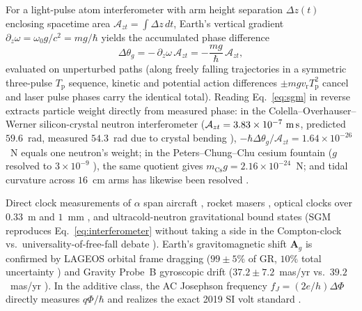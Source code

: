\documentclass[aps,prd,onecolumn,tightenlines,nofootinbib,notitlepage,10pt,floatfix]{revtex4-2}
\theoremstyle{indentedtheorem}
\begin{document}
For a light-pulse atom interferometer with arm height separation $\Delta z(t)$ enclosing spacetime area $\mathcal{A}_{zt}=\int\Delta z\,dt$, Earth's vertical gradient $\partial_z\omega=\omega_0 g/c^2=mg/\hbar$ yields the accumulated phase difference \citep{Anandan1977Gravitational,Stodolsky1979Matter,Kasevich1992Measurement,Storey1994Feynman,Peters1999Measurement}
\begin{equation}
    \Delta\theta_g = -\,\partial_z\omega\,\mathcal{A}_{zt} = -\frac{mg}{\hbar}\,\mathcal{A}_{zt} ,
    \label{eq:interferometer}
\end{equation}
evaluated on unperturbed paths (along freely falling trajectories in a symmetric three-pulse $T_\text{p}$ sequence, kinetic and potential action differences $\pm mgv_\text{r}T_\text{p}^2$ cancel and laser pulse phases carry the identical total). Reading Eq.~\eqref{eq:sgm} in reverse extracts particle weight directly from measured phase: in the Colella--Overhauser--Werner silicon-crystal neutron interferometer ($\mathcal{A}_{zt}=3.83\times 10^{-7}~\text{m\,s}$, predicted $59.6$~rad, measured $54.3$~rad due to crystal bending \citep{Colella1975Observation}), $-\hbar\Delta\theta_g/\mathcal{A}_{zt}=1.64\times 10^{-26}$~N equals one neutron's weight; in the Peters--Chung--Chu cesium fountain ($g$ resolved to $3\times 10^{-9}$ \citep{Peters1999Measurement}), the same quotient gives $m_\text{Cs}g=2.16\times 10^{-24}$~N; and tidal curvature across $16$~cm arms has likewise been resolved \citep{Asenbaum2017Phase}.

Direct clock measurements of $\alpha$ span aircraft \citep{Hafele1972Clocks,Hafele1972Observed}, rocket masers \citep{Vessot1980Test}, optical clocks over $0.33$~m \citep{Chou2010Optical} and $1$~mm \citep{Bothwell2022Resolving}, and ultracold-neutron gravitational bound states \citep{Nesvizhevsky2002Quantum} (SGM reproduces Eq.~\eqref{eq:interferometer} without taking a side in the Compton-clock vs.\ universality-of-free-fall debate \citep{Mueller2010Precision,Wolf2011,SinhaSamuel2011,Hohensee2012Comment,Wolf2012Reply,Schleich2013Representation,Roura2020Gravitational}). Earth's gravitomagnetic shift $\mathbf{A}_g$ is confirmed by LAGEOS orbital frame dragging ($99\pm 5\%$ of GR, $10\%$ total uncertainty \citep{Ciufolini2004Confirmation}) and Gravity Probe~B gyroscopic drift ($37.2\pm 7.2$~mas/yr vs.\ $39.2$~mas/yr \citep{Everitt2011Gravity}). In the additive class, the AC Josephson frequency $f_J=(2e/h)\Delta\Phi$ directly measures $q\Phi/\hbar$ and realizes the exact 2019 SI volt standard \citep{Josephson1962Possible,Shapiro1963Josephson,BIPM2019Ampere,CODATA2022Constants}.
\end{document}
